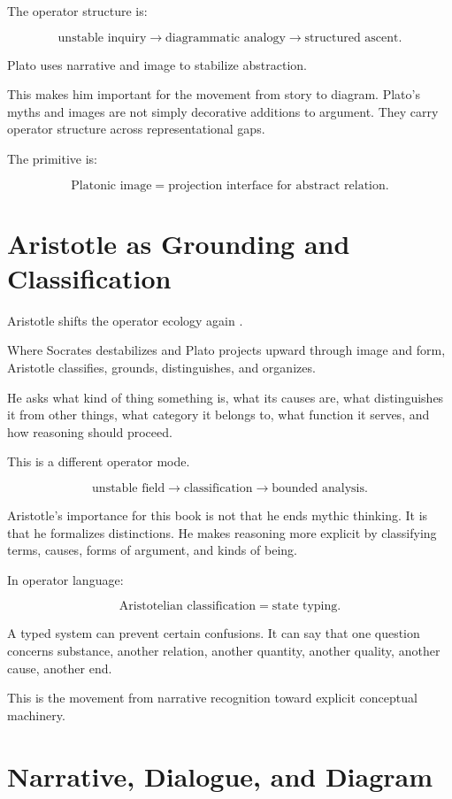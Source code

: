 \documentclass[11pt]{book}
\begin{document}
The operator structure is:

\[
\text{unstable inquiry}
\rightarrow
\text{diagrammatic analogy}
\rightarrow
\text{structured ascent}.
\]

Plato uses narrative and image to stabilize abstraction.

This makes him important for the movement from story to diagram. Plato's myths and images are not simply decorative additions to argument. They carry operator structure across representational gaps.

The primitive is:

\[
\text{Platonic image} = \text{projection interface for abstract relation}.
\]

\section{Aristotle as Grounding and Classification}

Aristotle shifts the operator ecology again \cite{AristotleBarnes1984CompleteWorks}.

Where Socrates destabilizes and Plato projects upward through image and form, Aristotle classifies, grounds, distinguishes, and organizes.

He asks what kind of thing something is, what its causes are, what distinguishes it from other things, what category it belongs to, what function it serves, and how reasoning should proceed.

This is a different operator mode.

\[
\text{unstable field}
\rightarrow
\text{classification}
\rightarrow
\text{bounded analysis}.
\]

Aristotle's importance for this book is not that he ends mythic thinking. It is that he formalizes distinctions. He makes reasoning more explicit by classifying terms, causes, forms of argument, and kinds of being.

In operator language:

\[
\text{Aristotelian classification} = \text{state typing}.
\]

A typed system can prevent certain confusions. It can say that one question concerns substance, another relation, another quantity, another quality, another cause, another end.

This is the movement from narrative recognition toward explicit conceptual machinery.

\section{Narrative, Dialogue, and Diagram}
\end{document}
